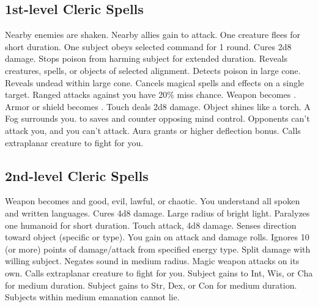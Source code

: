 \subsection{1st-level Cleric Spells}
\begin{spelllist}
 Nearby enemies are shaken.
 Nearby allies gain  to attack.
 One creature flees for short duration.
 One subject obeys selected command for 1 round.
 Cures 2d8 damage.
 Stops poison from harming subject for extended duration.
 Reveals creatures, spells, or objects of selected alignment.
 Detects poison in large cone.
 Reveals undead within large cone.
 Cancels magical spells and effects on a single target.
 Ranged attacks against you have 20\% miss chance.
 Weapon becomes .
 Armor or shield becomes .
 Touch deals 2d8 damage.
 Object shines like a torch.
 A Fog surrounds you.
  to saves and counter opposing mind control.
 Opponents can't attack you, and you can't attack.
 Aura grants  or higher deflection bonus.
 Calls extraplanar creature to fight for you.
\end{spelllist}

\subsection{2nd-level Cleric Spells}
\begin{spelllist}
 Weapon becomes  and good, evil, lawful, or chaotic.
 You understand all spoken and written languages.
 Cures 4d8 damage.
 Large radius of bright light.
 Paralyzes one humanoid for short duration.
 Touch attack, 4d8 damage.
 Senses direction toward object (specific or type).
 You gain  on attack and damage rolls.
 Ignores 10 (or more) points of damage/attack from specified energy type.
  Split damage with willing subject.
 Negates sound in medium radius.
 Magic weapon attacks on its own.
 Calls extraplanar creature to fight for you.
 Subject gains  to Int, Wis, or Cha for medium duration.
 Subject gains  to Str, Dex, or Con for medium duration.
 Subjects within medium emanation cannot lie.
\end{spelllist}

